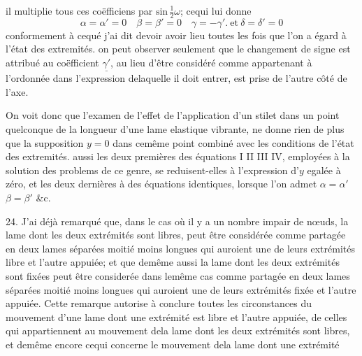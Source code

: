 \documentclass[11pt,a4paper]{article}
\begin{document}

il multiplie tous ces coëfficiens par $\text{sin}\,\frac{1}{2}\omega$; cequi lui donne
\[ \alpha = \alpha' = 0\quad \beta = \beta' = 0\quad \gamma = -\gamma'.\ \text{et}\ \delta = \delta' = 0 \]
conformement à cequé j'ai dit devoir
avoir lieu toutes les fois que l'on a égard à l'état des extremités. on peut
observer seulement que le changement de signe est attribué au coëfficient $\underline{\gamma'}$, au lieu
d'être considéré comme appartenant à l'ordonnée dans l'expression delaquelle il
doit entrer,  est prise de l'autre côté de l'axe.

On voit donc que l'examen de l'effet de l'application d'un stilet
dans un point quelconque de la longueur d'une lame elastique vibrante,
ne donne rien de plus que la supposition $y = 0$ dans cemême point
combiné avec les conditions  de l'état des extremités. aussi les
deux premières des équations I II III IV, employées à la solution des
problems de ce genre, se reduisent-elles  à
l'expression d'$y$ egalée à zéro, et les deux dernières à des équations identiques,
lorsque l'on admet $\alpha = \alpha'$ $\beta = \beta'$ \&c.

24. J'ai déjà remarqué que, dans le cas où il y a un nombre impair
de nœuds, la lame dont les deux extrémités sont libres, peut être considérée
comme partagée en deux lames séparées moitié moins longues qui auroient
une de leurs extrémités libre et l'autre appuiée; et que demême aussi la lame
dont les deux extrémités sont fixées peut être considerée dans lemême cas
comme partagée en deux lames séparées moitié moins longues qui auroient
une de leurs extrémités fixée et l'autre appuiée. Cette remarque autorise
à conclure toutes les circonstances du mouvement d'une lame dont une
extrémité est libre et l'autre appuiée, de celles qui appartiennent au
mouvement dela lame dont les deux extrémités sont libres, et demême
encore cequi concerne le mouvement dela lame dont une extrémité
\end{document}
